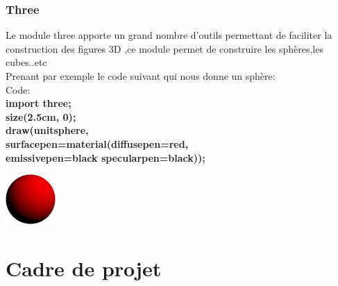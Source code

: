 \documentclass[a4paper]{report}
\begin{document}
\subsubsection{Three}
Le module three apporte un grand nombre d’outils permettant de faciliter la construction des figures 3D ,ce module permet de construire les sphères,les cubes..etc\\
Prenant par exemple le code suivant qui nous donne un sphère:\\
Code:\\
\textbf{import three;\\
size(2.5cm, 0);\\
draw(unitsphere,\\
surfacepen=material(diffusepen=red,\\
emissivepen=black specularpen=black));}\\
\begin{center}
    \includegraphics{images/Des6.png}
\end{center}
\newpage
\section{Cadre de projet}
\end{document}
